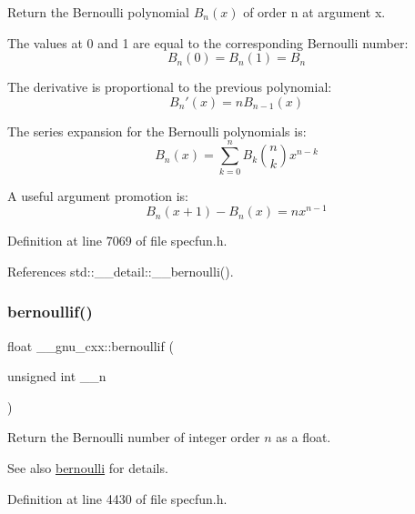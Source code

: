 Return the Bernoulli polynomial $ B_n(x) $ of order n at argument x.

The values at 0 and 1 are equal to the corresponding Bernoulli number\+: \[ B_n(0) = B_n(1) = B_n \]

The derivative is proportional to the previous polynomial\+: \[ B_n'(x) = n B_{n-1}(x) \]

The series expansion for the Bernoulli polynomials is\+: \[ B_n(x) = \sum_{k=0}^{n} B_k \binom{n}{k} x^{n-k} \]

A useful argument promotion is\+: \[ B_n(x+1) - B_n(x) = n x^{n-1} \] 

Definition at line 7069 of file specfun.\+h.



References std\+::\+\_\+\+\_\+detail\+::\+\_\+\+\_\+bernoulli().

\mbox{\label{group__gnu__math__spec__func_gabcd77f012ae74989c4bb9ca61978481d}} 
\subsubsection{\texorpdfstring{bernoullif()}{bernoullif()}}
{\footnotesize\ttfamily float \+\_\+\+\_\+gnu\+\_\+cxx\+::bernoullif (\begin{DoxyParamCaption}\item[{unsigned int}]{\+\_\+\+\_\+n }\end{DoxyParamCaption})\hspace{0.3cm}{\ttfamily [inline]}}

Return the Bernoulli number of integer order $ n $ as a {\ttfamily float}.

\begin{DoxySeeAlso}{See also}
\hyperlink{group__gnu__math__spec__func_gad339f0011df1967ec6c9e55bd1547bf4}{bernoulli} for details. 
\end{DoxySeeAlso}


Definition at line 4430 of file specfun.\+h.

\mbox{\label{group__gnu__math__spec__func_gaac8f04abfdd6b744d11cb73ec1f564b1}} 
